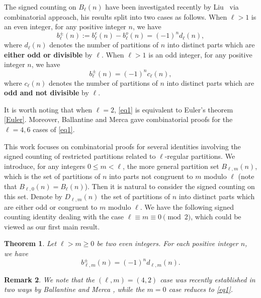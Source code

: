 \documentclass[12pt,reqno]{amsart}
\newtheorem{Theorem}{Theorem}[section]
\numberwithin{equation}{section}
\newtheorem{remark}[Theorem]{Remark}
\begin{document}
	The signed counting on $B_{\ell}(n)$ have been investigated recently by Liu~\cite[Theorems 1.1 and 1.2]{liu2025} via combinatorial approach, his results split into two cases as follows. When ${\ell}>1$ is an even integer, for any positive integer $n$, we have 
	\begin{equation}
		b^{\pm}_{\ell}(n):=b^e_{\ell}(n)-b^o_{\ell}(n)=(-1)^n d_{\ell}(n),
		\label{eq1}
	\end{equation}
	where $d_{\ell}(n)$ denotes the number of partitions of $n$ into distinct parts which are {\bf either odd or divisible} by $\ell$. When ${\ell}>1$ is an odd integer, for any positive integer $n$, we have
	\begin{equation}
		b^{\pm}_{\ell}(n)=(-1)^n c_{\ell}(n),
		\label{eq2}
	\end{equation}
	where $c_{\ell}(n)$ denotes the number of partitions of $n$ into distinct parts which are {\bf odd and not divisible} by $\ell$.
	
	It is worth noting that when $\ell=2$, \eqref{eq1} is equivalent to Euler's theorem \eqref{Euler}. Moreover, Ballantine and Merca \cite{ballantine20234,ballantine20236} gave combinatorial proofs for the ${\ell}=4,6$ cases of \eqref{eq1}.
	
	This work focuses on combinatorial proofs for several identities involving the signed counting of restricted partitions related to $\ell$-regular partitions. We introduce, for any integers $0\le m < \ell$, the more general partition set $B_{{\ell},m}(n)$, which is the set of partitions of $n$ into parts not congruent to $m$ modulo ${\ell}$ (note that $B_{\ell,0}(n)=B_{\ell}(n)$). Then it is natural to consider the signed counting on this set. Denote by $D_{\ell,m}(n)$ the set of partitions of $n$ into distinct parts which are either odd or congruent to $m$ modulo $\ell$. We have the following signed counting identity dealing with the case $\ell\equiv m\equiv 0\pmod 2$, which could be viewed as our first main result. 
	\begin{Theorem}
		Let ${\ell}>m\ge 0$ be two even integers. For each positive integer $n$, we have
		\begin{equation}
			b_{{\ell},m}^{\pm}(n)=(-1)^nd_{{\ell},m}(n).
			\label{eq3}
		\end{equation}
		\label{thm1}
	\end{Theorem}
	\begin{remark}\label{rmk:special case}
		We note that the $(\ell,m)=(4,2)$ case was recently established in two ways by Ballantine and Merca \cite[Theorem~1.1(i)]{ballantine20234}, while the $m=0$ case reduces to \eqref{eq1}.
	\end{remark}
	
\end{document}
